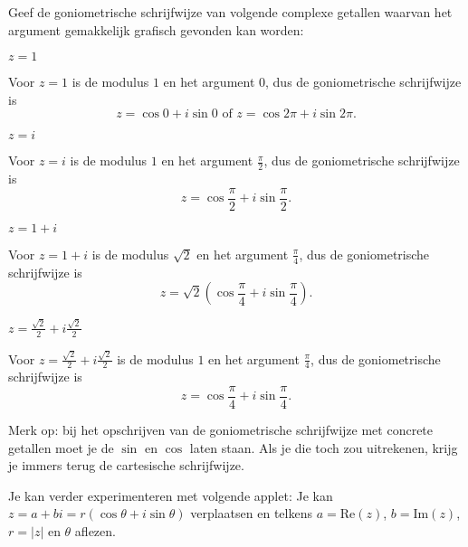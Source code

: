 \documentclass{ximera}
\begin{document}
\begin{exercise}\nl
    Geef de goniometrische schrijfwijze van volgende complexe getallen waarvan het argument gemakkelijk grafisch gevonden kan worden:
    \begin{question} $z=1 $
        \begin{oplossing}
          Voor $z=1 $ is de modulus $1$ en het argument $0$, dus de goniometrische schrijfwijze is $$z= \cos 0 + i\sin 0 \text{  of  } z= \cos 2\pi + i\sin 2\pi.$$
        \end{oplossing}
    \end{question}
\begin{question} $z=i $
    \begin{oplossing}
     Voor $z=i $ is de modulus $1$ en het argument $\frac{\pi}{2}$, dus de goniometrische schrijfwijze is $$z= \cos\frac{\pi}{2} + i \sin \frac{\pi}{2}.$$  
    \end{oplossing}
\end{question}
    \begin{question} $z=1+i$
        \begin{oplossing}
            Voor $z=1+i$ is de modulus $\sqrt{2}$ en het argument $\frac{\pi}{4}$, dus de goniometrische schrijfwijze is $$z= \sqrt{2}(\cos \frac{\pi}{4}+i\sin\frac{\pi}{4}).$$ 
        \end{oplossing}
    \end{question}
    \begin{question} $z=\frac{\sqrt2}{2}+i\frac{\sqrt2}{2}$
        \begin{oplossing}
            Voor $z=\frac{\sqrt2}{2}+i\frac{\sqrt2}{2}$ is de modulus $1$ en het argument $\frac{\pi}{4}$, dus de goniometrische schrijfwijze is $$z = \cos \frac{\pi}{4}+i\sin\frac{\pi}{4}.$$
        \end{oplossing}
    \end{question}
     
    Merk op: bij het opschrijven van de goniometrische schrijfwijze met concrete getallen moet je de $\sin$ en $\cos$ laten staan. Als je die toch zou uitrekenen, krijg je immers terug de cartesische schrijfwijze.
\end{exercise}
 
 
\begin{basicSkip}
Je kan verder experimenteren met volgende applet: Je kan $z= a+bi=r(\cos \theta+ i  \sin \theta)$ verplaatsen en telkens $a=\text{Re}(z)$, $b=\text{Im}(z)$, $r=|z|$ en $\theta$ aflezen.
 
\end{basicSkip}
 
\end{document}

